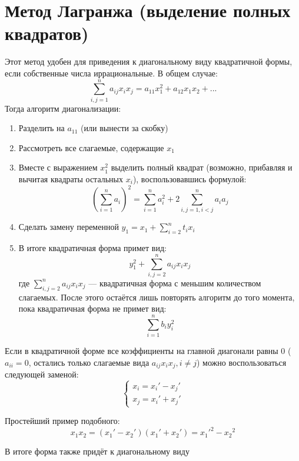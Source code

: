 \documentclass[12pt]{article}
\begin{document}
\section{Метод Лагранжа (выделение полных квадратов)}
Этот метод удобен для приведения к диагональному виду квадратичной формы, если собственные числа иррациональные. В общем случае:
\[
    \sum_{i,j=1}^n a_{ij}x_ix_j = a_{11}x_1^2 + a_{12}x_1x_2 + ...
\]
Тогда алгоритм диагонализации:
\begin{enumerate}
    \item Разделить на $a_{11}$ (или вынести за скобку)
    \item Рассмотреть все слагаемые, содержащие $x_1$
    \item Вместе с выражением $x_1^2$ выделить полный квадрат (возможно, прибавляя и вычитая квадраты остальных $x_i$), воспользовавшись формулой:
          \[
              (\sum_{i = 1}^n a_i)^2 = \sum_{i = 1}^na_i^2 + 2\sum_{i,j=1, i<j}^na_ia_j
          \]
    \item Сделать замену переменной $\displaystyle y_1 = x_1 + \sum_{i=2}^nt_ix_i$
    \item В итоге квадратичная форма примет вид:
          \[
              y_1^2 + \sum_{i,j=2}^na_{ij}x_ix_j
          \]
          где $\displaystyle \sum_{i,j=2}^na_{ij}x_ix_j$ — квадратичная форма с меньшим количеством слагаемых. После этого остаётся лишь повторять алгоритм до того момента, пока квадратичная форма не примет вид:
          \[
              \sum_{i=1}^nb_iy_i^2
          \]
\end{enumerate}

Если в квадратичной форме все коэффициенты на главной диагонали равны $0$ ($a_{ii} = 0$, остались только слагаемые вида $a_{ij}x_ix_j, i \neq j$) можно воспользоваться следующей заменой:
\[
    \begin{cases}
        x_i = x_i' - x_j' \\
        x_j = x_i' + x_j'
    \end{cases}
\]

Простейший пример подобного:
\[
    x_1x_2 = (x_1' - x_2')(x_1' + x_2') = {x_1'}^2 - {x_2}^2
\]

В итоге форма также придёт к диагональному виду
\end{document}
